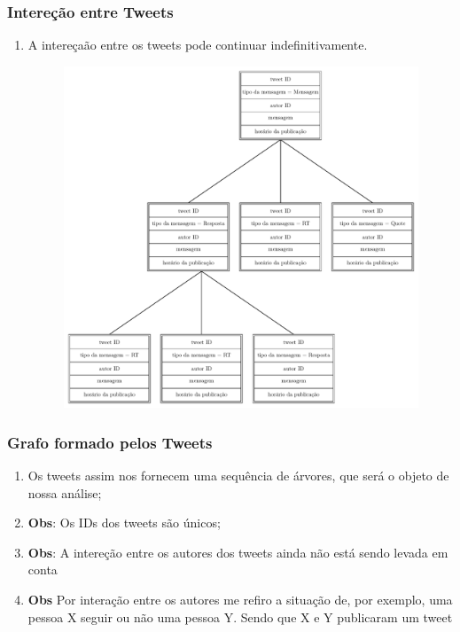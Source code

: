 \documentclass[11pt]{beamer}
\theoremstyle{remark}
\theoremstyle{definition}
\theoremstyle{plain}
\begin{document}
	\begin{frame}
		\frametitle{Intereção entre Tweets}
		\begin{enumerate}
			\item A intereçaão entre os tweets pode continuar indefinitivamente.
			\begin{figure}[h]
				\centering
				\includegraphics[scale=0.3]{pics/pic2.pdf}
			\end{figure}
		\end{enumerate}
		\end{frame}

	\begin{frame}
		\frametitle{Grafo formado pelos Tweets}
		\begin{enumerate}
			\item Os tweets assim nos fornecem uma sequência de árvores, 
				que será o objeto de nossa análise;
			\item \textbf{Obs}: Os IDs dos tweets são únicos;
			\item \textbf{Obs}: A intereção entre os autores dos tweets ainda
				não está sendo levada em conta
			\item \textbf{Obs} Por interação entre os autores me refiro a situação
				de, por exemplo, uma pessoa X seguir ou não uma pessoa Y.
				Sendo que X e Y publicaram um tweet
		\end{enumerate}
		\end{frame}
\end{document}
